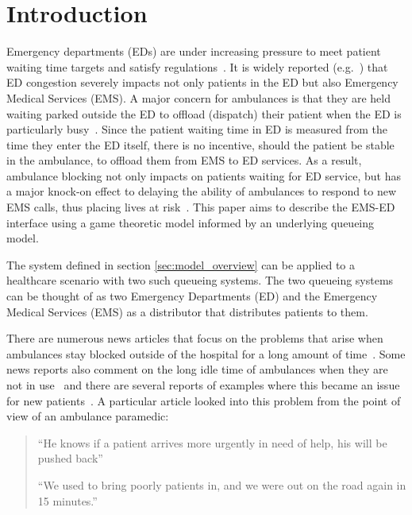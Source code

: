\section{Introduction}

Emergency departments (EDs) are under increasing pressure to meet patient
waiting time targets and satisfy 
regulations~\cite{EmergencyDepartmentWinterPressures}.
It is widely reported (e.g.~\cite{mirror, thenews, bmj}) that ED congestion 
severely impacts not only patients in the ED but also Emergency Medical 
Services (EMS).
A major concern for ambulances is that they are held waiting parked outside the
ED to offload (dispatch) their patient when the ED is particularly 
busy~\cite{clarey2014ambulance}. 
Since the patient waiting time in ED is measured from the time they enter the
ED itself, there is no incentive, should the patient be stable in the
ambulance, to offload them from EMS to ED services.
As a result, ambulance blocking not only impacts on patients waiting for ED
service, but has a major knock-on effect to delaying the ability of ambulances
to respond to new EMS calls, thus placing lives at risk~\cite{eastanglia}.
This paper aims to describe the EMS-ED interface using a game theoretic model
informed by an underlying queueing model. 

The system defined in section \ref{sec:model_overview} can be applied 
to a healthcare scenario with two such queueing systems.
The two queueing systems can be thought of as two Emergency Departments (ED) 
and the Emergency Medical Services (EMS) as a distributor that distributes 
patients to them.

There are numerous news articles that focus on the problems that arise when 
ambulances stay blocked outside of the hospital for a long amount of 
time~\cite{dailyrecords, staffordshirelive}.
Some news reports also comment on the long idle time of ambulances when 
they are not in use~\cite{herefordtimes} and there are several reports of 
examples where this became an issue for new patients~\cite{southwalesargus}.
A particular article looked into this problem from the point of view of an 
ambulance paramedic:

\begin{quotation}
    ``He knows if a patient arrives more urgently in need of help, his will be 
    pushed back''~\cite{bbcwales}

    ``We used to bring poorly patients in, and we were out on the road again in
    15 minutes.''~\cite{bbcwales}
\end{quotation}

